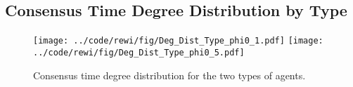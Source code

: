 \documentclass[a4paper,12pt]{scrartcl}
\begin{document}
\subsection{Consensus Time Degree Distribution by Type}
\begin{figure}
\centering
\texttt{[image: ../code/rewi/fig/Deg\_Dist\_Type\_phi0\_1.pdf]}
\texttt{[image: ../code/rewi/fig/Deg\_Dist\_Type\_phi0\_5.pdf]}
\caption{Consensus time degree distribution for the two types of agents.}
\end{figure}




\end{document}
